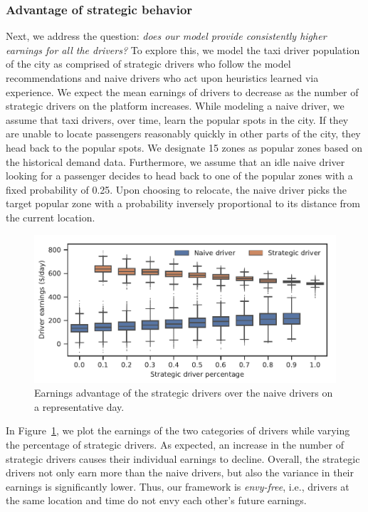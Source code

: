 \subsubsection{Advantage of strategic behavior}
Next, we address the question: \textit{does our model provide consistently
    higher earnings for all the drivers?}
To explore this, we model the taxi driver population of the city as comprised
    of strategic drivers who follow the model recommendations and naive drivers
    who act upon heuristics learned via experience. 
We expect the mean earnings of drivers to decrease as the number of
    strategic drivers on the platform increases.
While modeling a naive driver, we assume that taxi drivers, over time, 
    learn the popular spots in the city. 
If they are unable to locate passengers reasonably quickly 
    in other parts of the city, they head back to the popular spots. 
    We designate 15 zones %
    as
    popular zones based on the historical demand data.
Furthermore, we assume that an idle naive driver looking for a passenger decides to 
    head back to one of the popular zones with a fixed probability of 0.25. 
Upon choosing to relocate, the naive driver picks the target popular zone with a 
    probability inversely proportional to its distance from the current location.

\begin{figure}
	\centering
	\includegraphics[scale=0.5]{figures/strategic_vs_naive_driver.pdf}
    \caption{Earnings advantage of the strategic drivers over the naive drivers 
    on a representative day.} 
	\label{fig:strategic_vs_naive_driver}
\end{figure}

In Figure~\ref{fig:strategic_vs_naive_driver}, we plot the earnings of
    the two categories of drivers while varying the percentage of
    strategic drivers.
As expected, an increase in the number of strategic drivers causes their individual 
    earnings to decline. %
Overall, the strategic drivers not only earn more than the naive
    drivers, but also the variance in their earnings is significantly lower.
Thus, our framework is \emph{envy-free}, i.e., drivers at the same
    location and time do not envy each other's future earnings.

